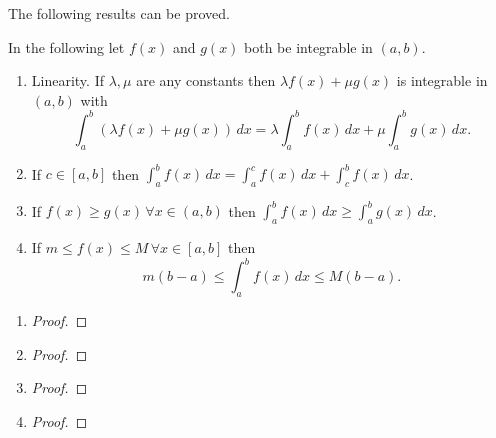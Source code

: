 \documentclass[10pt, a4paper]{article}
\begin{document}
The following results can be proved.
\begin{proposition}
    In the following let $f(x)$ and $g(x)$ both be integrable in $(a, b)$.
    \begin{enumerate}[label = (\roman*)]
        \item Linearity.
        If $\lambda, \mu$ are any constants then $\lambda f(x) + \mu g(x)$ is integrable in $(a, b)$ with
        \[
        \int_{a}^{b}\left(\lambda f(x) + \mu g(x)\right)\,dx = \lambda\int_{a}^{b}f(x)\,dx + \mu\int_{a}^{b}g(x)\,dx.
        \]
        \item If $c \in [a, b]$ then $\int_{a}^{b}f(x)\,dx = \int_{a}^{c}f(x)\,dx + \int_{c}^{b}f(x)\,dx$.
        \item If $f(x) \geq g(x)\,\forall x \in (a, b)$ then $\int_{a}^{b}f(x)\,dx \geq \int_{a}^{b}g(x)\,dx$.
        \item If $m \leq f(x) \leq M\,\forall x \in [a, b]$ then
        \[
        m(b - a) \leq \int_{a}^{b}f(x)\,dx \leq M(b - a).
        \]
    \end{enumerate}
    \begin{enumerate}[label = (\roman*)]
        \item
        \begin{proof}
        \end{proof}
        \item
        \begin{proof}
        \end{proof}
        \item
        \begin{proof}
        \end{proof}
        \item
        \begin{proof}
        \end{proof}
    \end{enumerate}
\end{proposition}
\end{document}
